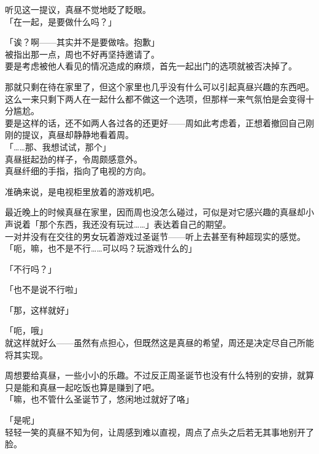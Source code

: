 听见这一提议，真昼不觉地眨了眨眼。\\

「在一起，是要做什么吗？」

「诶？啊——其实并不是要做啥。抱歉」\\

被指出那一点，周也不好再坚持邀请了。\\

要是考虑被他人看见的情况造成的麻烦，首先一起出门的选项就被否决掉了。

那就只剩在待在家里了，但这个家里也几乎没有什么可以引起真昼兴趣的东西吧。\\

这么一来只剩下两人在一起什么都不做这一个选项，但那样一来气氛怕是会变得十分尴尬。\\

要是这样的话，还不如两人各过各的还更好——周如此考虑着，正想着撤回自己刚刚的提议，真昼却静静地看着周。\\

「……那、我想试试，那个」\\

真昼挺起劲的样子，令周颇感意外。\\

真昼纤细的手指，指向了电视的方向。

准确来说，是电视柜里放着的游戏机吧。

最近晚上的时候真昼在家里，因而周也没怎么碰过，可似是对它感兴趣的真昼却小声说着「那个东西，我还没有玩过……」表达着自己的期望。\\

一对并没有在交往的男女玩着游戏过圣诞节——听上去甚至有种超现实的感觉。\\

「呃，嘛，也不是不行……可以吗？玩游戏什么的」

「不行吗？」

「也不是说不行啦」

「那，这样就好」

「呃，哦」\\

就这样就好么——虽然有点担心，但既然这是真昼的希望，周还是决定尽自己所能将其实现。

周想要给真昼，一些小小的乐趣。不过反正周圣诞节也没有什么特别的安排，就算只是能和真昼一起吃饭也算是赚到了吧。\\

「嘛，也不管什么圣诞节了，悠闲地过就好了咯」

「是呢」\\

轻轻一笑的真昼不知为何，让周感到难以直视，周点了点头之后若无其事地别开了脸。
